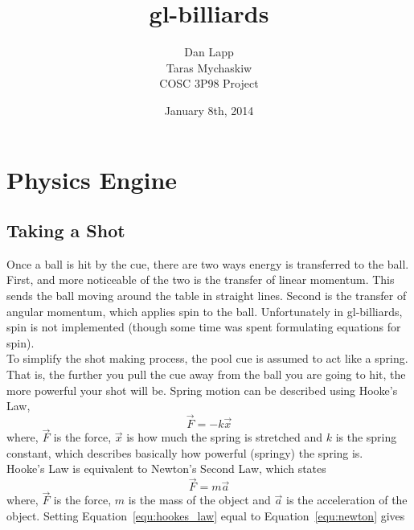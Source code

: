 \documentclass[12pt]{article}
\title{gl-billiards}
\author{Dan Lapp\\Taras Mychaskiw\\COSC 3P98 Project}
\date{January 8th, 2014}
\begin{document}
\maketitle
    \begin{abstract}
    \end{abstract}

    \thispagestyle{empty}
    \tableofcontents
    \thispagestyle{empty}
    \mbox{}
    \clearpage
    \setcounter{page}{1}
    
    \section{Physics Engine}
    
        \subsection{Taking a Shot}
        Once a ball is hit by the cue, there are two ways energy is transferred to the ball. First, and more noticeable of the two
        is the transfer of linear momentum. This sends the ball moving around the table in straight lines. Second is the transfer
        of angular momentum, which applies spin to the ball. Unfortunately in gl-billiards, spin is not implemented (though some
        time was spent formulating equations for spin). \\
        To simplify the shot making process, the pool cue is assumed to act like a spring. That is, the further you pull
        the cue away from the ball you are going to hit, the more powerful your shot will be. Spring motion can be described
        using Hooke's Law,
        \begin{equation}
            \vec F = -k \vec x
            \label{equ:hookes_law}
        \end{equation}
        where, $\vec F$ is the force, $\vec x$ is how much the spring is stretched and $k$ is the spring constant, which
        describes basically how powerful (springy) the spring is.
        \\
        Hooke's Law is equivalent to Newton's Second Law, which states
        \begin{equation}
            \vec F = m \vec a
            \label{equ:newton}
        \end{equation}
        where, $\vec F$ is the force, $m$ is the mass of the object and $\vec a$ is the acceleration of the object. Setting
        Equation~\ref{equ:hookes_law} equal to Equation~\ref{equ:newton} gives
\end{document}
